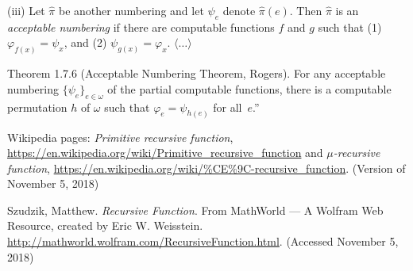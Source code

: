 \documentclass[12pt]{article}
\theoremstyle{remark}
\begin{document}
\begin{thebibliography}{99}
{{(iii) Let $\hat{\pi}$ be another numbering and let $\psi_e$ denote $\hat{\pi}(e)$. Then $\hat{\pi}$ is an \emph{acceptable numbering} if there are computable functions $f$ and $g$ such that (1)~$\varphi_{f(x)}=\psi_x$, and (2) $\psi_{g(x)}=\varphi_x$. $\langle\ldots\rangle$

Theorem 1.7.6 (Acceptable Numbering Theorem, Rogers). For any acceptable numbering $\{\psi_e\}_{e\in \omega}$ of the partial computable functions, there is a computable permutation $h$ of $\omega$ such that $\varphi_e = \psi_{h(e)}$ for all~$e$.''
}}

 Wikipedia pages: \emph{Primitive recursive function}, \url{https://en.wikipedia.org/wiki/Primitive_recursive_function} and \emph{$\mu$-recursive function}, \url{https://en.wikipedia.org/wiki/%CE%9C-recursive_function}. (Version of November 5, 2018)

Szudzik, Matthew. \emph{Recursive Function}. From MathWorld --- A Wolfram Web Resource, created by Eric W. Weisstein. \url{http://mathworld.wolfram.com/RecursiveFunction.html}. (Accessed November 5, 2018)

\end{thebibliography}
\end{document}
